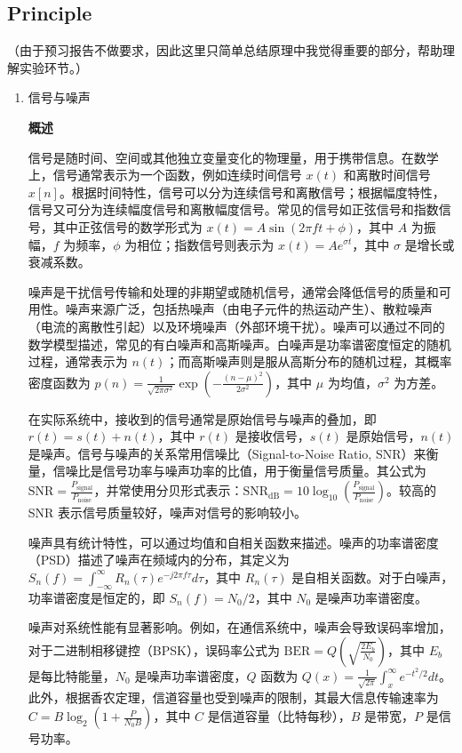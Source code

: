 \subsection{Principle}
（由于预习报告不做要求，因此这里只简单总结原理中我觉得重要的部分，帮助理解实验环节。）
\begin{enumerate}
	\item 信号与噪声
	
	\textbf{概述}
	
	信号是随时间、空间或其他独立变量变化的物理量，用于携带信息。在数学上，信号通常表示为一个函数，例如连续时间信号 \( x(t) \) 和离散时间信号 \( x[n] \)。根据时间特性，信号可以分为连续信号和离散信号；根据幅度特性，信号又可分为连续幅度信号和离散幅度信号。常见的信号如正弦信号和指数信号，其中正弦信号的数学形式为 \( x(t) = A \sin(2\pi f t + \phi) \)，其中 \( A \) 为振幅，\( f \) 为频率，\( \phi \) 为相位；指数信号则表示为 \( x(t) = A e^{\sigma t} \)，其中 \( \sigma \) 是增长或衰减系数。
	
	噪声是干扰信号传输和处理的非期望或随机信号，通常会降低信号的质量和可用性。噪声来源广泛，包括热噪声（由电子元件的热运动产生）、散粒噪声（电流的离散性引起）以及环境噪声（外部环境干扰）。噪声可以通过不同的数学模型描述，常见的有白噪声和高斯噪声。白噪声是功率谱密度恒定的随机过程，通常表示为 \( n(t) \)；而高斯噪声则是服从高斯分布的随机过程，其概率密度函数为 \( p(n) = \frac{1}{\sqrt{2\pi \sigma^2}} \exp\left( -\frac{(n - \mu)^2}{2\sigma^2} \right) \)，其中 \( \mu \) 为均值，\( \sigma^2 \) 为方差。
	
	在实际系统中，接收到的信号通常是原始信号与噪声的叠加，即 \( r(t) = s(t) + n(t) \)，其中 \( r(t) \) 是接收信号，\( s(t) \) 是原始信号，\( n(t) \) 是噪声。信号与噪声的关系常用信噪比（Signal-to-Noise Ratio, SNR）来衡量，信噪比是信号功率与噪声功率的比值，用于衡量信号质量。其公式为 \( \mathrm{SNR} = \frac{P_{\text{signal}}}{P_{\text{noise}}} \)，并常使用分贝形式表示：\( \mathrm{SNR}_{\mathrm{dB}} = 10 \log_{10} \left( \frac{P_{\text{signal}}}{P_{\text{noise}}} \right) \)。较高的 SNR 表示信号质量较好，噪声对信号的影响较小。
	
	噪声具有统计特性，可以通过均值和自相关函数来描述。噪声的功率谱密度（PSD）描述了噪声在频域内的分布，其定义为 \( S_n(f) = \int_{-\infty}^{\infty} R_n(\tau) e^{-j2\pi f \tau} d\tau \)，其中 \( R_n(\tau) \) 是自相关函数。对于白噪声，功率谱密度是恒定的，即 \( S_n(f) = N_0 / 2 \)，其中 \( N_0 \) 是噪声功率谱密度。
	
	噪声对系统性能有显著影响。例如，在通信系统中，噪声会导致误码率增加，对于二进制相移键控（BPSK），误码率公式为 \( \mathrm{BER} = Q\left( \sqrt{\frac{2E_b}{N_0}} \right) \)，其中 \( E_b \) 是每比特能量，\( N_0 \) 是噪声功率谱密度，\( Q \) 函数为 \( Q(x) = \frac{1}{\sqrt{2\pi}} \int_x^\infty e^{-t^2/2} dt \)。此外，根据香农定理，信道容量也受到噪声的限制，其最大信息传输速率为 \( C = B \log_2\left(1 + \frac{P}{N_0 B}\right) \)，其中 \( C \) 是信道容量（比特每秒），\( B \) 是带宽，\( P \) 是信号功率。
	

\end{enumerate}
